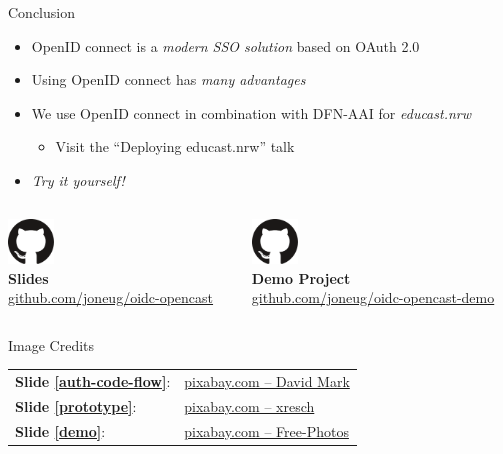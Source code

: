 \documentclass[aspectratio=169]{beamer}
\begin{document}
\begin{frame}{Conclusion}
	\begin{itemize}
		\item OpenID connect is a \emph{modern SSO solution} based on OAuth 2.0
		\item Using OpenID connect has \emph{many advantages}
		\item We use OpenID connect in combination with DFN-AAI for \emph{educast.nrw}
		\begin{itemize}
			\item Visit the \enquote{Deploying educast.nrw} talk 
		\end{itemize}
		\item \emph{Try it yourself!}
	\end{itemize}
	\vspace{1em}
	\begin{columns}
		\begin{column}{0.5\textwidth}
			\centering
			\includegraphics[height=1.2cm]{figures/github-logo} \\
			\textbf{Slides} \\
			\href{https://github.com/joneug/oidc-opencast}{github.com/joneug/oidc-opencast}
		\end{column}
		\begin{column}{0.5\textwidth}
			\centering
			\includegraphics[height=1.2cm]{figures/github-logo} \\
			\textbf{Demo Project} \\
			\href{httpgithub.com/joneug/oidc-opencast-demo}{github.com/joneug/oidc-opencast-demo}
		\end{column}
	\end{columns}
\end{frame}

\makeref

\begin{frame}{Image Credits}
	\footnotesize
	\begin{tabular}{ll}
		\textbf{Slide \ref{auth-code-flow}}: & \href{https://pixabay.com/images/id-1751463/}{pixabay.com -- David Mark} \\
		\textbf{Slide \ref{prototype}}: & \href{https://pixabay.com/images/id-4056027/}{pixabay.com -- xresch} \\
		\textbf{Slide \ref{demo}}:& \href{https://pixabay.com/images/id-1209641/}{pixabay.com -- Free-Photos}
	\end{tabular}
\end{frame}
\end{document}
